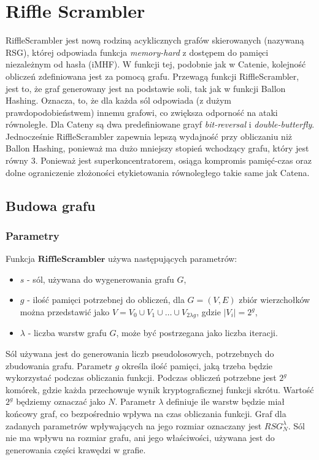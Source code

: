 \chapter{Riffle Scrambler}
\thispagestyle{chapterBeginStyle}
\label{razdzial2}

RiffleScrambler \cite{rs} jest nową rodziną acyklicznych grafów skierowanych (nazywaną RSG), której odpowiada funkcja \textit{memory-hard} z dostępem do pamięci niezależnym od hasła (iMHF).
W funkcji tej, podobnie jak w Catenie, kolejność obliczeń zdefiniowana jest za pomocą grafu. 
Przewagą funkcji RiffleScrambler, jest to, że graf generowany jest na podstawie soli, tak jak w funkcji Ballon Hashing. Oznacza, to, że dla każda sól odpowiada (z dużym prawdopodobieństwem) innemu grafowi, co zwiększa odporność na ataki równoległe. Dla Cateny są dwa predefiniowane grayf \textit{bit-reversal} i \textit{double-butterfly}.
Jednocześnie RiffleScrambler zapewnia lepszą wydajność przy obliczaniu niż Ballon Hashing, ponieważ ma dużo mniejszy stopień wchodzący grafu, który jest równy 3.
Ponieważ jest superkoncentratorem, osiąga kompromis pamięć-czas oraz dolne ograniczenie złożoności etykietowania równoległego takie same jak Catena.

\section{Budowa grafu}

\subsection{Parametry} \label{2::params}
Funkcja $\mathbf{RiffleScrambler}$ używa następujących parametrów:
\begin{itemize}
	\item $s$ - sól, używana do wygenerowania grafu $G$,
	
	\item $g$ - \label{rs::g} ilość pamięci potrzebnej do obliczeń, dla $G = (V, E)$ zbiór wierzchołków można przedstawić jako $V = V_{0} \cup V_{1} \cup \dots \cup V_{2 \lambda g}$, gdzie $|V_{i}| = 2^{g}$,
	
	\item $\lambda$ - liczba warstw grafu $G$, może być postrzegana jako liczba iteracji.
\end{itemize}

Sól używana jest do generowania liczb pseudolosowych, potrzebnych do zbudowania grafu.
Parametr $g$ określa ilość pamięci, jaką trzeba będzie wykorzystać podczas obliczania funkcji. Podczas obliczeń potrzebne jest $2^{g}$ komórek, gdzie każda przechowuje wynik kryptograficznej funkcji skrótu. Wartość $2^g$ będziemy oznaczać jako $N$.
Parametr $\lambda$ definiuje ile warstw będzie miał końcowy graf, co bezpośrednio wpływa na czas obliczania funkcji.
Graf dla zadanych parametrów wpływających na jego rozmiar oznaczany jest $RSG_{N}^{\lambda}$. Sól nie ma wpływu na rozmiar grafu, ani jego właściwości, używana jest do generowania części krawędzi w grafie.



